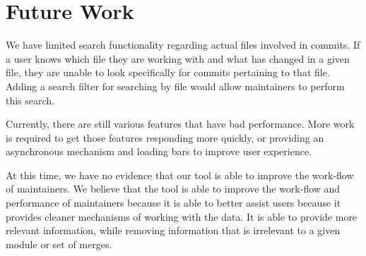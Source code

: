 \documentclass[conference, draftclsnofoot]{IEEEtran}
\begin{document}
% 
% 
% 
% 
% 



\section{Future Work}
We have limited search functionality regarding actual files involved in
commits. If a user knows which file they are working with and what has changed
in a given file, they are unable to look specifically for commits pertaining to
that file. Adding a search filter for searching by file would allow maintainers
to perform this search.

Currently, there are still various features that have bad performance. More
work is required to get those features responding more quickly, or providing an
asynchronous mechanism and loading bars to improve user experience.

At this time, we have no evidence that our tool is able to improve the
work-flow of maintainers. We believe that the tool is able to improve the
work-flow and performance of maintainers because it is able to better assist
users because it provides cleaner mechanisms of working with the data. It is
able to provide more relevant information, while removing information that is
irrelevant to a given module or set of merges.
\end{document}
